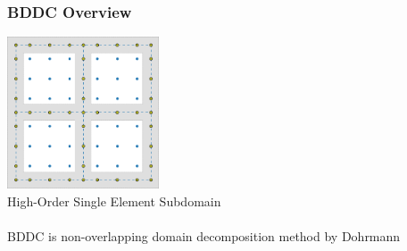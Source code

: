 \documentclass{beamer}
\begin{document}
\begin{frame}
\begin{center}
\frametitle{BDDC Overview}

\includegraphics[height=4.5cm]{../img/HighOrderBDDCMeshInterface}\\
{\small High-Order Single Element Subdomain}\\

~\\

BDDC is non-overlapping domain decomposition method by Dohrmann \cite{dohrmann2003preconditioner}

\end{center}
\end{frame}

\end{document}
